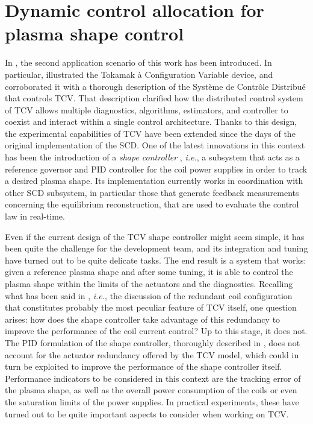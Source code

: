 \section{Dynamic control allocation for plasma shape control}
\label{sec:allocation}
In , the second application scenario of this work has been introduced. In particular,  illustrated the Tokamak à Configuration Variable device, and  corroborated it with a thorough description of the Système de Contrôle Distribué that controls TCV. That description clarified how the distributed control system of TCV allows multiple diagnostics, algorithms, estimators, and controller to coexist and interact within a single control architecture. Thanks to this design, the experimental capabilities of TCV have been extended since the days of the original implementation of the SCD. One of the latest innovations in this context has been the introduction of a \emph{shape controller} \cite{mele_design_2024}, \emph{i.e.}, a subsystem that acts as a reference governor and PID controller for the coil power supplies in order to track a desired plasma shape. Its implementation currently works in coordination with other SCD subsystem, in particular those that generate feedback measurements concerning the equilibrium reconstruction, that are used to evaluate the control law in real-time.

Even if the current design of the TCV shape controller might seem simple, it has been quite the challenge for the development team, and its integration and tuning have turned out to be quite delicate tasks. The end result is a system that works: given a reference plasma shape and after some tuning, it is able to control the plasma shape within the limits of the actuators and the diagnostics. Recalling what has been said in , \emph{i.e.}, the discussion of the redundant coil configuration that constitutes probably the most peculiar feature of TCV itself, one question arises: how does the shape controller take advantage of this redundancy to improve the performance of the coil current control? Up to this stage, it does not. The PID formulation of the shape controller, thoroughly described in \cite{mele_design_2024}, does not account for the actuator redundancy offered by the TCV model, which could in turn be exploited to improve the performance of the shape controller itself. Performance indicators to be considered in this context are the tracking error of the plasma shape, as well as the overall power consumption of the coils or even the saturation limits of the power supplies. In practical experiments, these have turned out to be quite important aspects to consider when working on TCV.

